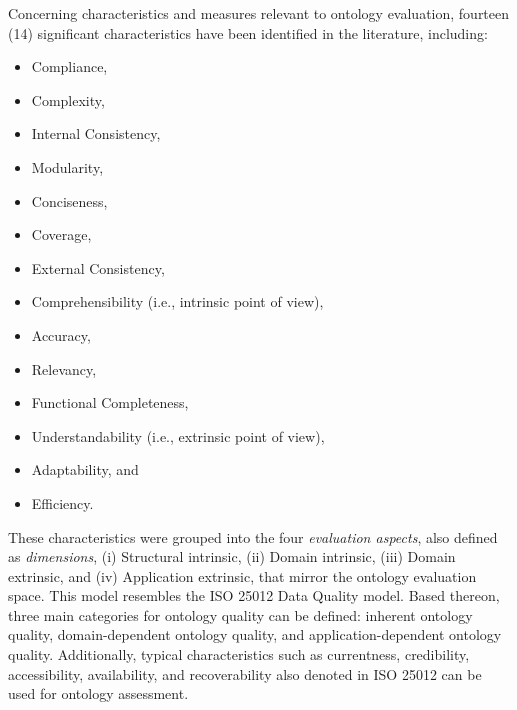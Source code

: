 Concerning characteristics and measures relevant to ontology evaluation, fourteen (14) significant characteristics have been identified in the literature, including:
\begin{itemize}
  \item Compliance,
  \item Complexity,
  \item Internal Consistency,
  \item Modularity,
  \item Conciseness,
  \item Coverage,
  \item External Consistency,
  \item Comprehensibility (i.e., intrinsic point of view),
  \item Accuracy,
  \item Relevancy,
  \item Functional Completeness,
  \item Understandability (i.e., extrinsic point of view),
  \item Adaptability, and
  \item Efficiency.
\end{itemize}
These characteristics were grouped into the four \textit{evaluation aspects}, also defined as \textit{dimensions}, (i) Structural intrinsic, (ii) Domain intrinsic, (iii) Domain extrinsic, and (iv) Application extrinsic, that mirror the ontology evaluation space. This model resembles the ISO 25012 Data Quality model. Based thereon, three main categories for ontology quality can be defined: inherent ontology quality, domain-dependent ontology quality, and application-dependent ontology quality. Additionally, typical characteristics such as currentness, credibility, accessibility, availability, and recoverability also denoted in ISO 25012 can be used for ontology assessment. 